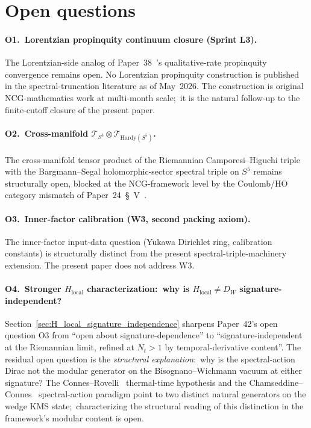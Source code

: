 \documentclass[11pt,a4paper]{article}
\theoremstyle{plain}
\theoremstyle{definition}
\newcommand{\Nt}{N_t}
\newcommand{\sthree}{S^{3}}
\newcommand{\Tcal}{\mathcal{T}}
\begin{document}
\section{Open questions}\label{sec:open_questions}

\paragraph{O1.\ Lorentzian propinquity continuum closure (Sprint L3).}
The Lorentzian-side analog of Paper~38~\cite{paper38}'s qualitative-rate
propinquity convergence remains open. No Lorentzian propinquity
construction is published in the spectral-truncation literature as of
May~2026. The construction is original NCG-mathematics work at
multi-month scale;\ it is the natural follow-up to the finite-cutoff
closure of the present paper.

\paragraph{O2.\ Cross-manifold $\Tcal_{\sthree} \otimes
\Tcal_{\mathrm{Hardy}(S^5)}$.} The cross-manifold tensor product of
the Riemannian Camporesi--Higuchi triple with the Bargmann--Segal
holomorphic-sector spectral triple on $S^5$ remains structurally
open, blocked at the NCG-framework level by the Coulomb/HO category
mismatch of Paper~24~\S~V~\cite{paper24}.

\paragraph{O3.\ Inner-factor calibration (W3, second packing axiom).}
The inner-factor input-data question (Yukawa Dirichlet ring,
calibration constants) is structurally distinct from the present
spectral-triple-machinery extension. The present paper does not
address W3.

\paragraph{O4.\ Stronger $H_{\mathrm{local}}$ characterization:\ why is
$H_{\mathrm{local}} \ne D_W$ signature-independent?}
Section~\ref{sec:H_local_signature_independence} sharpens Paper~42's
open question O3 from ``open about signature-dependence'' to
``signature-independent at the Riemannian limit, refined at $\Nt > 1$
by temporal-derivative content''. The residual open question is the
\emph{structural explanation}:\ why is the spectral-action Dirac not
the modular generator on the Bisognano--Wichmann vacuum at either
signature? The Connes--Rovelli~\cite{connes_rovelli1994} thermal-time
hypothesis and the Chamseddine--Connes~\cite{chamseddine_connes2010}
spectral-action paradigm point to two distinct natural generators on
the wedge KMS state;\ characterizing the structural reading of this
distinction in the framework's modular content is open.
\end{document}
